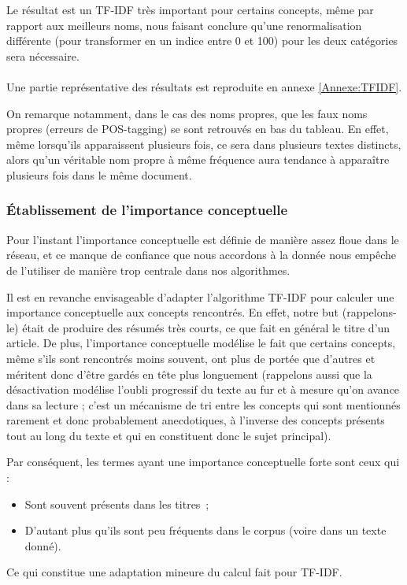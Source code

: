 \documentclass[a4paper, 12pt]{article}
\begin{document}
Le résultat est un TF-IDF très important pour certains concepts, même par rapport aux meilleurs noms, nous faisant conclure qu'une renormalisation différente (pour transformer en un indice entre 0 et 100) pour les deux catégories sera nécessaire.

\paragraph{}
Une partie représentative des résultats est reproduite en annexe \ref{Annexe:TFIDF}.

On remarque notamment, dans le cas des noms propres, que les faux noms propres (erreurs de POS-tagging) se sont retrouvés en bas du tableau. En effet, même lorsqu'ils apparaissent plusieurs fois, ce sera dans plusieurs textes distincts, alors qu'un véritable nom propre à même fréquence aura tendance à apparaître plusieurs fois dans le même document.


\subsubsection{Établissement de l'importance conceptuelle}

Pour l'instant l'importance conceptuelle est définie de manière assez floue dans le réseau, et ce manque de confiance que nous accordons à la donnée nous empêche de l'utiliser de manière trop centrale dans nos algorithmes.

Il est en revanche envisageable d'adapter l'algorithme TF-IDF pour calculer une importance conceptuelle aux concepts rencontrés. En effet, notre but (rappelons-le) était de produire des résumés très courts, ce que fait en général le titre d'un article. De plus, l'importance conceptuelle modélise le fait que certains concepts, même s'ils sont rencontrés moins souvent, ont plus de portée que d'autres et méritent donc d'être gardés en tête plus longuement (rappelons aussi que la désactivation modélise l'oubli progressif du texte au fur et à mesure qu'on avance dans sa lecture ; c'est un mécanisme de tri entre les concepts qui sont mentionnés rarement et donc probablement anecdotiques, à l'inverse des concepts présents tout au long du texte et qui en constituent donc le sujet principal).

Par conséquent, les termes ayant une importance conceptuelle forte sont ceux qui :
\begin{itemize}
	\item Sont souvent présents dans les titres~;
	\item D'autant plus qu'ils sont peu fréquents dans le corpus (voire dans un texte donné).
\end{itemize}
Ce qui constitue une adaptation mineure du calcul fait pour TF-IDF.
\end{document}
